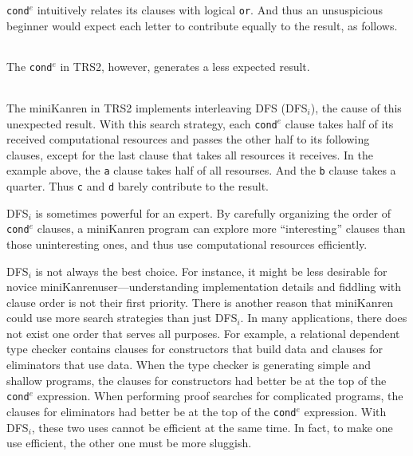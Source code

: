 \documentclass[format=acmlarge, review=true, authordraft=true]{acmart}
\newcommand{\conde}{\texttt{cond$^e$}}
\newcommand{\clisting}[1]{
\begin{center}
  \begin{tabular}{c}
	
    \end{tabular}
\end{center}
}
\newcommand{\DFSi }[0]{DFS$_{i}$}
\begin{document}
\clisting{Figures/example.rkt}

\noindent \conde{} intuitively relates its clauses with logical \texttt{or}. And thus an 
unsuspicious beginner would expect each letter to contribute equally to the 
result, as follows.

\clisting{Figures/run-repeato-fair.rkt}

\noindent The \conde{} in TRS2, however, generates a less expected result.

\clisting{Figures/run-repeato-idfs.rkt}

The miniKanren in TRS2 implements interleaving DFS (\DFSi), the cause of this 
unexpected result. With this search strategy, each \conde{} clause takes half 
of its received computational resources and passes the other half to its 
following clauses, except for the last clause that takes all resources it 
receives. In the example above, the \texttt{a} clause takes half of all 
resourses. And the \texttt{b} clause takes a quarter. Thus \texttt{c} and 
\texttt{d} barely contribute to the result.


\DFSi{} is sometimes powerful for an expert. By carefully organizing the order 
of \conde{} clauses, a miniKanren program can explore more ``interesting'' 
clauses than those uninteresting ones, and thus use computational resources 
efficiently.


\DFSi{} is not always the best choice. For instance, it might be less 
desirable for novice miniKanrenuser---understanding implementation details and 
fiddling with clause order is not their first priority. 
There is another reason that miniKanren could use more search strategies than
just \DFSi. In many applications, there does not exist one order that serves all
purposes. For example, a relational dependent type checker contains
clauses for constructors that build data and clauses for eliminators that use
data. When the type checker is generating simple and shallow programs,
the clauses for constructors had better be at the top of the
\conde{} expression.
When performing proof searches for complicated programs, the clauses for 
eliminators had better be at the top of the \conde{} expression. With \DFSi, 
these two uses cannot be efficient at the same time. In fact, to make one use 
efficient, the other one must be more sluggish.
\end{document}
